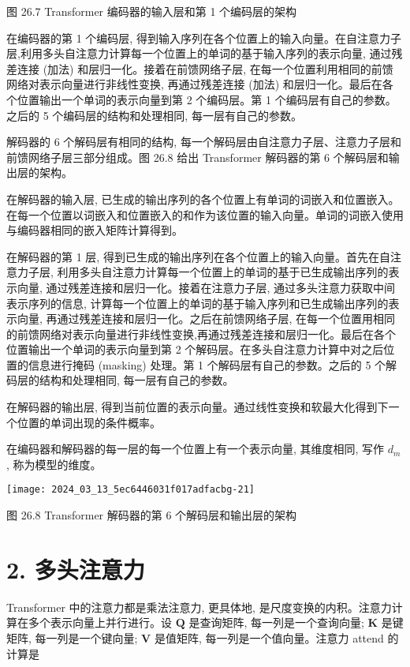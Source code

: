 \documentclass[10pt]{article}
\begin{document}
图 26.7 Transformer 编码器的输入层和第 1 个编码层的架构

在编码器的第 1 个编码层, 得到输入序列在各个位置上的输入向量。在自注意力子层,利用多头自注意力计算每一个位置上的单词的基于输入序列的表示向量, 通过残差连接 (加法) 和层归一化。接着在前馈网络子层, 在每一个位置利用相同的前馈网络对表示向量进行非线性变换, 再通过残差连接 (加法) 和层归一化。最后在各个位置输出一个单词的表示向量到第 2 个编码层。第 1 个编码层有自己的参数。之后的 5 个编码层的结构和处理相同, 每一层有自己的参数。

解码器的 6 个解码层有相同的结构, 每一个解码层由自注意力子层、注意力子层和前馈网络子层三部分组成。图 26.8 给出 Transformer 解码器的第 6 个解码层和输出层的架构。

在解码器的输入层, 已生成的输出序列的各个位置上有单词的词嵌入和位置嵌入。在每一个位置以词嵌入和位置嵌入的和作为该位置的输入向量。单词的词嵌入使用与编码器相同的嵌入矩阵计算得到。

在解码器的第 1 层, 得到已生成的输出序列在各个位置上的输入向量。首先在自注意力子层, 利用多头自注意力计算每一个位置上的单词的基于已生成输出序列的表示向量, 通过残差连接和层归一化。接着在注意力子层, 通过多头注意力获取中间表示序列的信息, 计算每一个位置上的单词的基于输入序列和已生成输出序列的表示向量, 再通过残差连接和层归一化。之后在前馈网络子层, 在每一个位置用相同的前馈网络对表示向量进行非线性变换,再通过残差连接和层归一化。最后在各个位置输出一个单词的表示向量到第 2 个解码层。在多头自注意力计算中对之后位置的信息进行掩码 (masking) 处理。第 1 个解码层有自己的参数。之后的 5 个解码层的结构和处理相同, 每一层有自己的参数。

在解码器的输出层, 得到当前位置的表示向量。通过线性变换和软最大化得到下一个位置的单词出现的条件概率。

在编码器和解码器的每一层的每一个位置上有一个表示向量, 其维度相同, 写作 $d_{m}$, 称为模型的维度。

\begin{center}
\texttt{[image: 2024\_03\_13\_5ec6446031f017adfacbg-21]}
\end{center}

图 26.8 Transformer 解码器的第 6 个解码层和输出层的架构

\section*{2. 多头注意力}
Transformer 中的注意力都是乘法注意力, 更具体地, 是尺度变换的内积。注意力计算在多个表示向量上并行进行。设 $\boldsymbol{Q}$ 是查询矩阵, 每一列是一个查询向量; $\boldsymbol{K}$ 是键矩阵, 每一列是一个键向量; $\boldsymbol{V}$ 是值矩阵, 每一列是一个值向量。注意力 attend 的计算是
\end{document}
